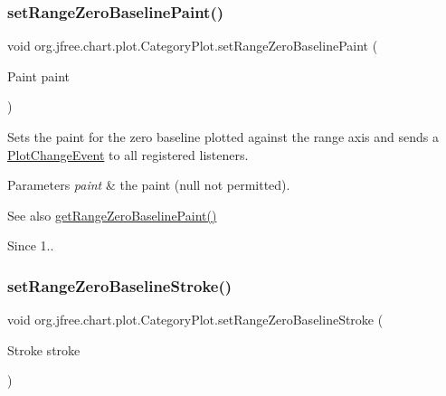 \subsubsection{\texorpdfstring{set\+Range\+Zero\+Baseline\+Paint()}{setRangeZeroBaselinePaint()}}
{\footnotesize\ttfamily void org.\+jfree.\+chart.\+plot.\+Category\+Plot.\+set\+Range\+Zero\+Baseline\+Paint (\begin{DoxyParamCaption}\item[{Paint}]{paint }\end{DoxyParamCaption})}

Sets the paint for the zero baseline plotted against the range axis and sends a \mbox{\hyperlink{}{Plot\+Change\+Event}} to all registered listeners.


\begin{DoxyParams}{Parameters}
{\em paint} & the paint ({\ttfamily null} not permitted).\\
\hline
\end{DoxyParams}
\begin{DoxySeeAlso}{See also}
\mbox{\hyperlink{classorg_1_1jfree_1_1chart_1_1plot_1_1_category_plot_aa8276ead4325ef7f44f3d138bb8ef23e}{get\+Range\+Zero\+Baseline\+Paint()}}
\end{DoxySeeAlso}
\begin{DoxySince}{Since}
1.. 
\end{DoxySince}
\mbox{\label{classorg_1_1jfree_1_1chart_1_1plot_1_1_category_plot_a9a31e7897f3b93d1bd8b77e2c35ca08b}} 
\subsubsection{\texorpdfstring{set\+Range\+Zero\+Baseline\+Stroke()}{setRangeZeroBaselineStroke()}}
{\footnotesize\ttfamily void org.\+jfree.\+chart.\+plot.\+Category\+Plot.\+set\+Range\+Zero\+Baseline\+Stroke (\begin{DoxyParamCaption}\item[{Stroke}]{stroke }\end{DoxyParamCaption})}

